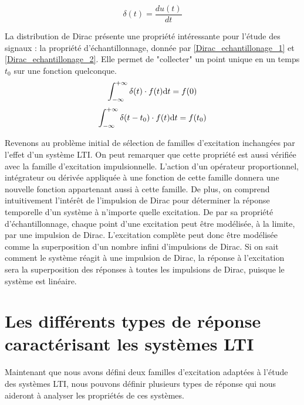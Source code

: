 	
	\begin{equation}\label{Dirac}
	\delta (t) = \frac{du(t)}{dt}	 	
	\end{equation}
	
	La distribution de Dirac présente une propriété intéressante pour l'étude des signaux : la propriété d'échantillonnage, donnée par \ref{Dirac_echantillonage_1} et \ref{Dirac_echantillonage_2}. Elle permet de "collecter" un point unique en un temps  $t_{0}$ sur une fonction quelconque.
	\begin{equation}\label{Dirac_echantillonage_1}
	\int_{-\infty}^{+\infty} \delta (t) \cdot f(t) \mathrm{d} t = f(0) 	 
	\end{equation}
	\begin{equation}\label{Dirac_echantillonage_2} 	
	\int_{-\infty}^{+\infty} \delta (t-t_{0}) \cdot f(t) \mathrm{d} t = f(t_{0}) 
	\end{equation}
	
	\vspace{0.5\baselineskip}
	Revenons au problème initial de sélection de familles d'excitation inchangées par l'effet d'un système LTI. On peut remarquer que cette propriété est aussi vérifiée avec la famille d'excitation impulsionnelle. L'action d'un opérateur proportionnel, intégrateur ou dérivée appliquée à une fonction de cette famille donnera une nouvelle fonction appartenant aussi à cette famille. De plus, on comprend intuitivement l'intérêt de l'impulsion de Dirac pour déterminer la réponse temporelle d'un système à n'importe quelle excitation. De par sa propriété d'échantillonnage, chaque point d'une excitation peut être modélisée, à la limite, par une impulsion de Dirac. L'excitation complète peut donc être modélisée comme la superposition d'un nombre infini d'impulsions de Dirac. Si on sait comment le système réagit à une impulsion de Dirac, la réponse à l'excitation sera la superposition des réponses à toutes les impulsions de Dirac, puisque le système est linéaire.
	
	\vspace{1\baselineskip}
	
	
	\section{Les différents types de réponse caractérisant les systèmes LTI}
	Maintenant que nous avons défini deux familles d'excitation adaptées à l'étude des systèmes LTI, nous pouvons définir plusieurs types de réponse qui nous aideront à analyser les propriétés de ces systèmes.
		
